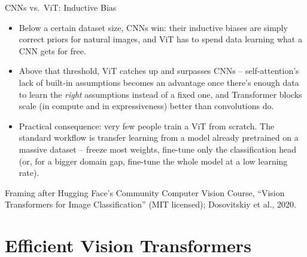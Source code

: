 \begin{vbframe}{CNNs vs.\ ViT: Inductive Bias}
\begin{itemize}
  \item Below a certain dataset size, CNNs win: their inductive biases are simply correct priors for natural images, and ViT has to spend data learning what a CNN gets for free.
  \item Above that threshold, ViT catches up and surpasses CNNs -- self-attention's lack of built-in assumptions becomes an advantage once there's enough data to learn the \emph{right} assumptions instead of a fixed one, and Transformer blocks scale (in compute and in expressiveness) better than convolutions do.
  \item Practical consequence: very few people train a ViT from scratch. The standard workflow is transfer learning from a model already pretrained on a massive dataset -- freeze most weights, fine-tune only the classification head (or, for a bigger domain gap, fine-tune the whole model at a low learning rate).
\end{itemize}
{\footnotesize Framing after Hugging Face's Community Computer Vision Course, \enquote{Vision Transformers for Image Classification} (MIT licensed); Dosovitskiy et al., 2020.}
\end{vbframe}


\section{Efficient Vision Transformers}

